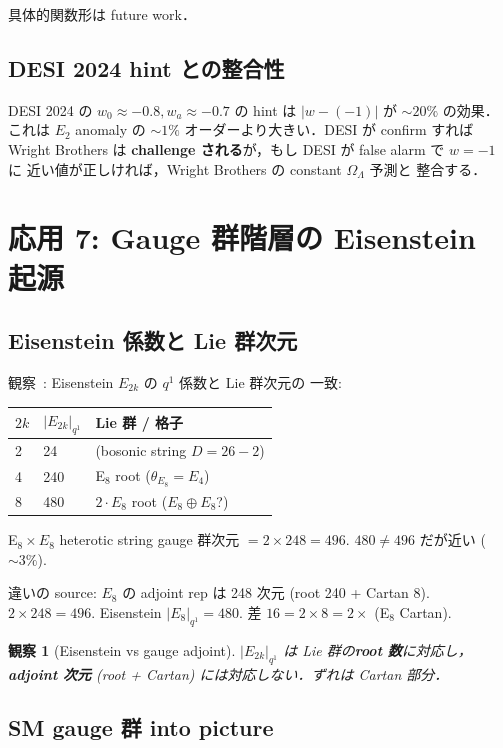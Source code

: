 \documentclass[11pt,a4paper]{article}
\newtheorem{observation}{観察}
\begin{document}
具体的関数形は future work．

\subsection{DESI 2024 hint との整合性}

DESI 2024 の $w_0 \approx -0.8, w_a \approx -0.7$ の hint は
$|w-(-1)|$ が $\sim 20\%$ の効果．これは $E_2$ anomaly の $\sim 1\%$
オーダーより大きい．DESI が confirm すれば Wright Brothers は
\textbf{challenge される}が，もし DESI が false alarm で $w=-1$ に
近い値が正しければ，Wright Brothers の constant $\Omega_\Lambda$ 予測と
整合する．

\section{応用 7: Gauge 群階層の Eisenstein 起源}

\subsection{Eisenstein 係数と Lie 群次元}

観察~\cite{wb-spec-z}: Eisenstein $E_{2k}$ の $q^1$ 係数と Lie 群次元の
一致:
\begin{center}
\begin{tabular}{lll}
\toprule
$2k$ & $|E_{2k}|_{q^1}$ & Lie 群 / 格子 \\
\midrule
2 & 24 & (bosonic string $D=26-2$) \\
4 & 240 & E$_8$ root ($\theta_{E_8} = E_4$) \\
8 & 480 & $2 \cdot E_8$ root ($E_8 \oplus E_8$?) \\
\bottomrule
\end{tabular}
\end{center}

E$_8 \times E_8$ heterotic string gauge 群次元 $= 2 \times 248 = 496$.
$480 \neq 496$ だが近い ($\sim 3\%$).

違いの source: $E_8$ の adjoint rep は 248 次元 (root 240 + Cartan 8).
$2 \times 248 = 496$. Eisenstein $|E_8|_{q^1} = 480$. 差 $16 = 2 \times 8
= 2 \times$ (E$_8$ Cartan).

\begin{observation}[Eisenstein vs gauge adjoint]
$|E_{2k}|_{q^1}$ は Lie 群の\textbf{root 数}に対応し，\textbf{adjoint 次元}
(root + Cartan) には対応しない．ずれは Cartan 部分．
\end{observation}

\subsection{SM gauge 群 into picture}
\end{document}
